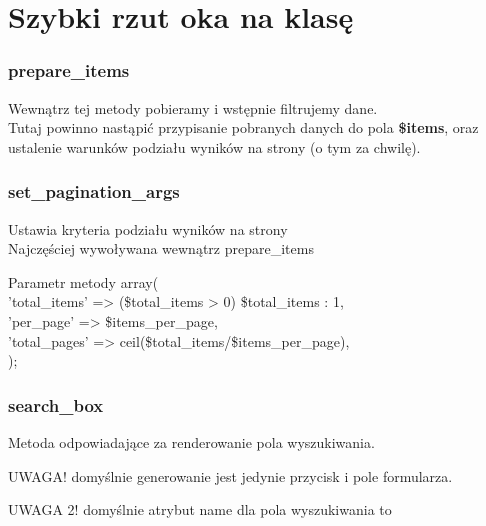 \documentclass[a4paper, 16pt]{beamer}
\begin{document}
	\section{Szybki rzut oka na klasę}
			\begin{frame}
				\frametitle{prepare\_items}
				Wewnątrz tej metody pobieramy i wstępnie filtrujemy dane.\\
				Tutaj powinno nastąpić przypisanie pobranych danych do pola \textbf{\$items}, oraz ustalenie warunków podziału wyników na strony (o tym za chwilę).
			\end{frame}
			\begin{frame}
				\frametitle{set\_pagination\_args}
				Ustawia kryteria podziału wyników na strony\\
				Najczęściej wywoływana wewnątrz prepare\_items
				\begin{exampleblock}{Parametr metody}
			        array(\\
	            	\hspace{0.5cm}'total\_items' => (\$total\_items > 0) \? \$total\_items : 1,\\
	            	\hspace{0.5cm}'per\_page' => \$items\_per\_page, \\
	            	\hspace{0.5cm}'total\_pages' => ceil(\$total\_items/\$items\_per\_page), \\
	        		);
        		\end{exampleblock}
			\end{frame}
			\begin{frame}
				\frametitle{search\_box}
				Metoda odpowiadające za renderowanie pola wyszukiwania.\\
				\begin{alertblock}
					{UWAGA!} domyślnie generowanie jest jedynie przycisk i pole formularza.
				\end{alertblock}
				\begin{alertblock}
					{UWAGA 2!} domyślnie atrybut name dla pola wyszukiwania to \textbs{s}
				\end{alertblock}
			\end{frame}
\end{document}
